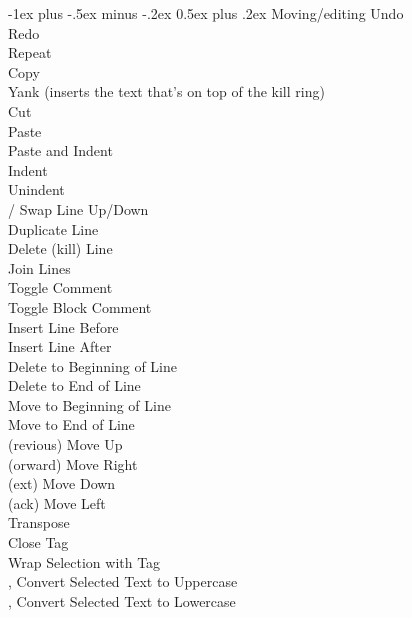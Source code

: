 \documentclass[10pt,landscape]{article}
\makeatletter
\renewcommand{\section}{\@startsection{section}{1}{0mm}%
                                {-1ex plus -.5ex minus -.2ex}%
                                {0.5ex plus .2ex}%
                                {\normalfont\large\bfseries}}
\makeatother
\begin{document}
\begin{multicols}{3}
\section{Moving/editing}
 Undo \\
 Redo \\
 Repeat \\
 Copy \\
 Yank (inserts the text that's on top of the kill ring)\\
 Cut \\
 Paste \\
 Paste and Indent \\
\keys{\cmd+]} Indent \\
\keys{\cmd+[} Unindent \\
\keys{\cmd+\ctrl+\arrowkeyup}/\keys{\arrowkeydown} Swap Line Up/Down \\
 Duplicate Line \\
 Delete (kill) Line \\
 Join Lines \\
\keys{\cmd+/} Toggle Comment \\
\keys{\cmd+\Alt+/} Toggle Block Comment \\
\keys{\cmd+\shift+\return} Insert Line Before \\
\keys{\cmd+\return} Insert Line After \\
\keys{\cmd+\backspace} Delete to Beginning of Line \\
 Delete to End of Line \\
 Move to Beginning of Line \\
 Move to End of Line \\
(revious) Move Up \\
(orward) Move Right \\
(ext) Move Down \\
(ack) Move Left \\
 Transpose \\
 Close Tag \\
 Wrap Selection with Tag \\
,  Convert Selected Text to Uppercase \\
,  Convert Selected Text to Lowercase \\

\end{multicols}
\end{document}
